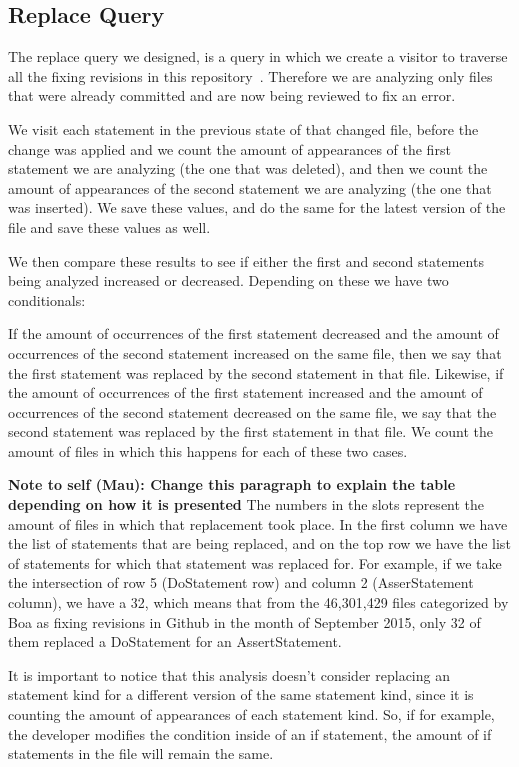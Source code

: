 \documentclass{sig-alternate-05-2015}
\newcommand{\todo}[1]
  {{\scriptsize \textbf{\color{red} {#1}}}}
\begin{document}
\subsection{Replace Query}
The replace query we designed, is a query in which we create a visitor to traverse all the fixing revisions in this repository~\cite{dyer2013}. Therefore we are analyzing only files
that were already committed and are now being reviewed to fix an error. 

We visit each statement in the previous state of that changed
file, before the change was applied and we count the amount of appearances of
the first statement we are analyzing (the one that was deleted), and then we
count the amount of appearances of the second statement we are analyzing (the
one that was inserted). We save these values, and do the same for the latest
version of the file and save these values as well.

We then compare these results to see if either the first and second statements
being analyzed increased or decreased. Depending on these we have two
conditionals:

If the amount of occurrences of the first statement decreased and the amount of
occurrences of the second statement increased on the same file, then we say that
the first statement was replaced by the second statement in that file. Likewise,
if the amount of occurrences of the first statement increased and the amount of
occurrences of the second statement decreased on the same file, we say that the
second statement was replaced by the first statement in that file. We count the
amount of files in which this happens for each of these two cases.

\todo{Note to self (Mau): Change this paragraph to explain the table depending on how it is presented}
The numbers in the slots represent the amount of files in which that replacement took place. In the first column we have the list of statements that are being replaced, and on the top row we have the list of statements for which that statement was replaced for. For example, if we take the intersection of row 5 (DoStatement row) and column 2 (AsserStatement column), we have a 32, which means that from the 46,301,429 files categorized by Boa as fixing revisions in Github in the month of September 2015, only 32 of them replaced a DoStatement for an AssertStatement.

It is important to notice  that this analysis doesn't consider replacing an statement kind for a different version of the same statement kind, since it is counting the amount of appearances of each statement kind. So, if for example, the developer modifies the condition inside of an if statement, the amount of if statements in the file will remain the same.
\end{document}
